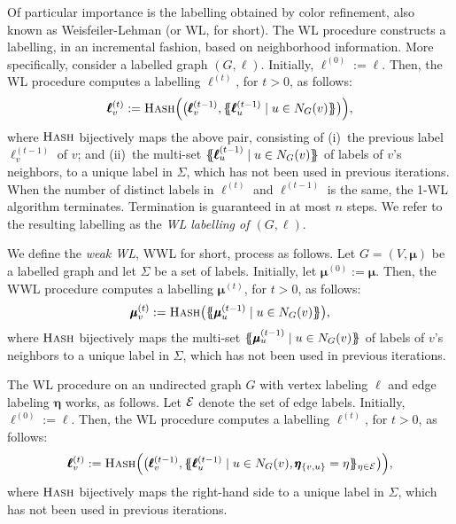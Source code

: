 Of particular importance is the labelling obtained by color refinement, also known as Weisfeiler-Lehman (or WL, for short). The WL procedure constructs a labelling, in an incremental fashion, based on neighborhood information. More specifically, consider a labelled graph $(G,\pmb{\ell})$. Initially, 
$\pmb{\ell}^{(0)}:=\pmb{\ell}$. Then, the WL procedure computes a labelling $\pmb{\ell}^{(t)}$, for $t> 0$, as follows: 
$$
\pmb{\ell}^{(t)}_v:=\textsc{Hash}\Bigl(\bigl(\pmb{\ell}^{(t-1)}_v,\{\!\!\{ \pmb{\ell}_u^{(t-1)} \mathrel{\mid} u \in N_G(v) \}\!\!\}\bigr)\Bigr),
$$
where $\textsc{Hash}$ bijectively maps the above pair, consisting of (i)~the previous label 
$\pmb{\ell}^{(t-1)}_v$ of $v$; and (ii)~the multi-set $\{\!\!\{ \pmb{\ell}_u^{(t-1)} \mathrel{\mid} u \in N_G(v) \}\!\!\}$ of labels of $v$'s neighbors, to a unique label in $\Sigma$, which has not been used in previous iterations. When the number of distinct labels in $\pmb{\ell}^{(t)}$ and $\pmb{\ell}^{(t-1)}$ is the same, the 1-WL algorithm terminates.
Termination is guaranteed in at most $n$ steps. We refer to the resulting labelling as the \textit{WL labelling of $(G,\pmb{\ell})$}. 


We define the \textit{weak WL}, WWL for short, process as follows. Let $G=(V,\pmb{\mu})$ be a labelled graph and let $\Sigma$ be a set of labels. Initially, let $\pmb{\mu}^{(0)}:=\pmb{\mu}$. 
Then, the WWL procedure computes a labelling $\pmb{\mu}^{(t)}$, for $t> 0$, as follows: 
$$
\pmb{\mu}^{(t)}_v:=\textsc{Hash}\bigl(\{\!\!\{ \pmb{\mu}_u^{(t-1)} \mathrel{\mid} u \in N_G(v) \}\!\!\}\bigr),
$$
where $\textsc{Hash}$ bijectively maps the multi-set $\{\!\!\{ \pmb{\mu}_u^{(t-1)} \mathrel{\mid} u \in N_G(v) \}\!\!\}$ of labels of $v$'s neighbors to a unique label in $\Sigma$, which has not been used in previous iterations. 


The WL procedure on an undirected graph $G$ with vertex labeling $\pmb{\ell}$ and edge labeling $\pmb{\eta}$ works, as follows.  Let ${\cal E}$ denote the set of edge labels. Initially, 
$\pmb{\ell}^{(0)}:=\pmb{\ell}$. Then, the WL procedure computes a labelling $\pmb{\ell}^{(t)}$, for $t> 0$, as follows: 
$$
\pmb{\ell}^{(t)}_v:=\textsc{Hash}\Bigl(\bigl(\pmb{\ell}^{(t-1)}_v,\{\!\!\{ \pmb{\ell}_u^{(t-1)} \mathrel{\mid} u \in N_G(v), \pmb{\eta}_{\{v,u\}}=\eta \}\!\!\}_{\eta\in{\cal E}}\bigr)\Bigr),
$$
where $\textsc{Hash}$ bijectively maps the right-hand side to a unique label in $\Sigma$, which has not been used in previous iterations.
